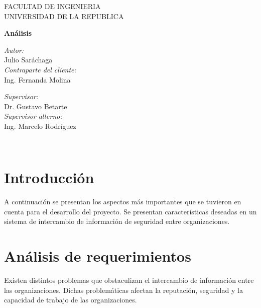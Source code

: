 \documentclass[11pt]{article}
\title{}
\begin{document}
  
   \begin{titlepage}

\begin{center}
\vspace*{-1in}

FACULTAD DE INGENIERIA\\
\vspace*{0.15in}
UNIVERSIDAD DE LA REPUBLICA \\
\vspace*{0.6in}
\vspace*{0.2in}
\begin{Large}
\textbf{Análisis} \\
\end{Large}
\vspace*{0.3in}
\end{center}

\begin{minipage}{0.4\textwidth}
\begin{flushleft} \large
\emph{Autor:}\\
Julio Saráchaga\\
\bigskip
\emph{Contraparte del cliente:}\\
Ing. Fernanda Molina
\end{flushleft}
\end{minipage}
\begin{minipage}{0.4\textwidth}
\begin{flushright} \large
\emph{Supervisor:} \\
Dr. Gustavo Betarte\\
\bigskip
\emph{Supervisor alterno:} \\
Ing. Marcelo Rodríguez
\end{flushright}
\end{minipage}\\[3cm]

\end{titlepage}
\bigskip

\section{Introducción}
{
A continuación se presentan los aspectos más importantes que se tuvieron en cuenta para el desarrollo del proyecto. Se
presentan características deseadas en un sistema de intercambio de información de seguridad entre organizaciones.}

\section{Análisis de requerimientos}
{
Existen distintos problemas que obstaculizan el intercambio de información entre las organizaciones. Dichas
problemáticas afectan la reputación, seguridad y la capacidad de trabajo de las organizaciones. }
\end{document}

